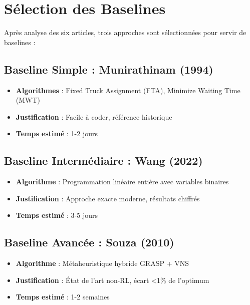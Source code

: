 \documentclass[12pt,a4paper]{article}
\begin{document}
\section{S\'election des Baselines}

Apr\`es analyse des six articles, trois approches sont s\'electionn\'ees pour servir de baselines :

\subsection{Baseline Simple : Munirathinam (1994)}

\begin{itemize}
    \item \textbf{Algorithmes} : Fixed Truck Assignment (FTA), Minimize Waiting Time (MWT)
    \item \textbf{Justification} : Facile \`a coder, r\'ef\'erence historique
    \item \textbf{Temps estim\'e} : 1-2 jours
\end{itemize}

\subsection{Baseline Interm\'ediaire : Wang (2022)}

\begin{itemize}
    \item \textbf{Algorithme} : Programmation lin\'eaire enti\`ere avec variables binaires
    \item \textbf{Justification} : Approche exacte moderne, r\'esultats chiffr\'es
    \item \textbf{Temps estim\'e} : 3-5 jours
\end{itemize}

\subsection{Baseline Avanc\'ee : Souza (2010)}

\begin{itemize}
    \item \textbf{Algorithme} : M\'etaheuristique hybride GRASP + VNS
    \item \textbf{Justification} : \'Etat de l'art non-RL, \'ecart <1\% de l'optimum
    \item \textbf{Temps estim\'e} : 1-2 semaines
\end{itemize}
\end{document}
